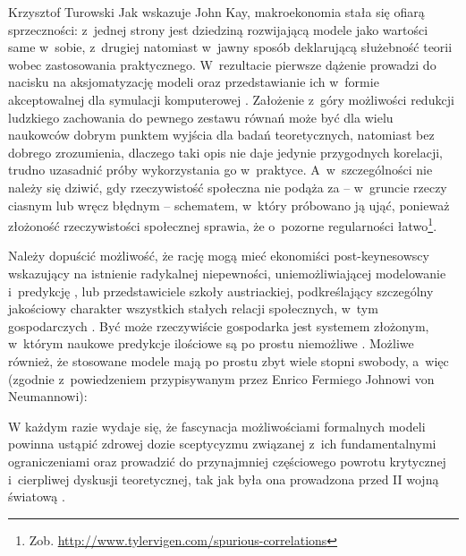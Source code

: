 \begin{artplenv}{Krzysztof Turowski}
Jak wskazuje John Kay, makroekonomia stała się ofiarą sprzeczności: z~jednej strony jest dziedziną rozwijającą modele
jako wartości same w~sobie, z~drugiej natomiast w~jawny sposób deklarującą służebność teorii wobec zastosowania
praktycznego. W~rezultacie pierwsze dążenie prowadzi do nacisku na aksjomatyzację modeli oraz przedstawianie
ich w~formie akceptowalnej dla symulacji komputerowej
\parencite{kay_map_2012}.
Założenie z~góry możliwości
redukcji ludzkiego zachowania do pewnego zestawu równań może być dla wielu naukowców dobrym punktem wyjścia dla badań
teoretycznych, natomiast bez dobrego zrozumienia, dlaczego taki opis nie daje jedynie przygodnych korelacji, trudno
uzasadnić próby wykorzystania go w~praktyce. A~w~szczególności nie należy się dziwić, gdy rzeczywistość społeczna nie
podąża za  --  w~gruncie rzeczy ciasnym lub wręcz błędnym  --  schematem, w~który próbowano ją ująć,
ponieważ złożoność rzeczywistości społecznej sprawia, że o~pozorne regularności łatwo\footnote{Zob.
\url{http://www.tylervigen.com/spurious-correlations}}.

Należy dopuścić możliwość, że rację mogą mieć ekonomiści post-keynesowscy wskazujący na istnienie radykalnej
niepewności, uniemożliwiającej modelowanie i~predykcję
\parencite{davidson_keynes_2009},
lub przedstawiciele
szkoły austriackiej, podkreślający szczególny jakościowy charakter wszystkich stałych relacji społecznych, w~tym
gospodarczych
\parencite{mises_ludzkie_2007}.
Być może rzeczywiście gospodarka jest systemem złożonym, w~którym
naukowe predykcje ilościowe są po prostu niemożliwe
\parencite{hayek_theory_1964}.
Możliwe również, że stosowane modele mają po
prostu zbyt wiele stopni swobody, a~więc (zgodnie z~powiedzeniem przypisywanym przez Enrico
Fermiego Johnowi von Neumannowi):


W każdym razie wydaje się, że fascynacja możliwościami formalnych modeli powinna ustąpić zdrowej dozie sceptycyzmu
związanej z~ich fundamentalnymi ograniczeniami oraz prowadzić do przynajmniej częściowego powrotu krytycznej i~cierpliwej
dyskusji teoretycznej, tak jak była ona prowadzona przed II wojną światową
\parencite{blaug_formalist_2003_tur}.


\end{artplenv}
